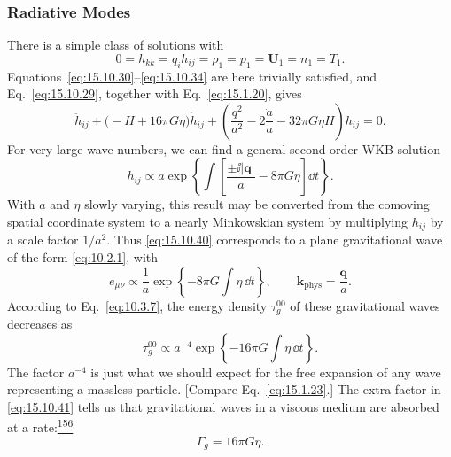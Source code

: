 \subsubsection*{Radiative Modes}

There is a simple class of solutions with
\begin{equation}
  0
  =
  h_{kk}
  =
  q_i h_{ij}
  =
  \rho_1
  =
  p_1
  =
  \mathbf U_1
  =
  n_1
  =
  T_1.
  \tag{15.10.38}\label{eq:15.10.38}
\end{equation}
Equations~\eqref{eq:15.10.30}--\eqref{eq:15.10.34} are here trivially
satisfied, and Eq.~\eqref{eq:15.10.29}, together with
Eq.~\eqref{eq:15.1.20}, gives
\begin{equation}
  \ddot h_{ij}
  +\bigl(-H+16\pi G\eta\bigr)\dot h_{ij}
  +\left(
    \frac{q^2}{a^2}
    -2\frac{\ddot a}{a}
    -32\pi G\eta H
  \right)h_{ij}
  =0.
  \tag{15.10.39}\label{eq:15.10.39}
\end{equation}
For very large wave numbers, we can find a general second-order WKB solution
\begin{equation}
  h_{ij}
  \propto
  a\exp\left\{
    \int
    \left[
      \frac{\pm\ii\lvert\mathbf q\rvert}{a}
      -8\pi G\eta
    \right]\dd t
  \right\}.
  \tag{15.10.40}\label{eq:15.10.40}
\end{equation}
With \(a\) and \(\eta\) slowly varying, this result may be converted from
the comoving spatial coordinate system to a nearly Minkowskian system by
multiplying \(h_{ij}\) by a scale factor \(1/a^2\). Thus
\eqref{eq:15.10.40} corresponds to a plane gravitational wave of the form
\eqref{eq:10.2.1}, with
\[
  e_{\mu\nu}
  \propto
  \frac1a
  \exp\left\{-8\pi G\int\eta\,\dd t\right\},
  \qquad
  \mathbf{k}_{\mathrm{phys}}=\frac{\mathbf q}{a}.
\]
According to Eq.~\eqref{eq:10.3.7}, the energy density
\(\tau_g^{00}\) of these gravitational waves decreases as
\begin{equation}
  \tau_g^{00}
  \propto
  a^{-4}
  \exp\left\{-16\pi G\int\eta\,\dd t\right\}.
  \tag{15.10.41}\label{eq:15.10.41}
\end{equation}
The factor \(a^{-4}\) is just what we should expect for the free expansion
of any wave representing a massless particle. [Compare
Eq.~\eqref{eq:15.1.23}.] The extra factor in \eqref{eq:15.10.41} tells us
that gravitational waves in a viscous medium are absorbed at a
rate:\hyperref[ch15-ref-156]{\textsuperscript{156}}
\begin{equation}
  \Gamma_g=16\pi G\eta.
  \tag{15.10.42}\label{eq:15.10.42}
\end{equation}
